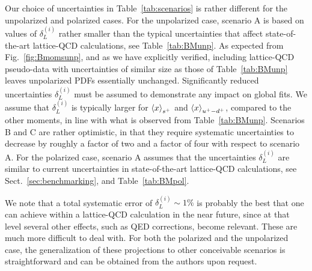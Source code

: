    
Our choice of uncertainties in Table~\ref{tab:scenarios}
is rather different for the unpolarized and polarized cases.
%
For the unpolarized case, scenario A is based on values
of $\delta_L^{(i)}$ rather smaller than the typical uncertainties that affect 
state-of-the-art lattice-QCD calculations, see Table~\ref{tab:BMunp}.
%
As expected from Fig.~\ref{fig:Bmomsunp}, and as we have explicitly verified,
including lattice-QCD pseudo-data with uncertainties of similar size as those 
of Table~\ref{tab:BMunp} leaves unpolarized PDFs essentially unchanged.
%
Significantly reduced uncertainties $\delta_L^{(i)}$ must be assumed to 
demonstrate any impact on global fits.
%
We assume that $\delta_L^{(i)}$ is typically larger for $\left\langle x\right\rangle_{s^+}$
and $\left\langle x\right\rangle_{u^+-d^+}$, compared to the other moments, in line with 
what is observed from Table~\ref{tab:BMunp}.
%
Scenarios B and C are rather optimistic, in that they require systematic 
uncertainties to decrease by roughly a factor of two and a factor of four 
with respect to scenario A.
%    
For the polarized case, scenario A assumes that the uncertainties 
$\delta_L^{(i)}$ are similar to current uncertainties in
state-of-the-art lattice-QCD calculations, see Sect.~\ref{sec:benchmarking},
and Table~\ref{tab:BMpol}.

We note that a total systematic error of $\delta_L^{(i)}\sim 1\%$
is probably the best that one can achieve within a lattice-QCD calculation 
in the near future, since at that level several other effects, such as QED 
corrections, become relevant. These are much more difficult to deal with.
%
For both the polarized and the unpolarized case, the generalization of these 
projections to other conceivable scenarios
is straightforward and can be obtained from the authors upon request.
 


